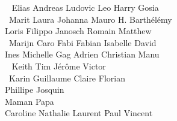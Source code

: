 \ \hspace{0.8cm} Elias \hspace{1.2cm} Andreas \hspace{0.9cm} Ludovic \hspace{2cm}Leo \hspace{0.6cm}Harry \hspace{1.1cm}Gosia\\

\ Marit \hspace{0.8cm}Laura \hspace{0.9cm}Johanna \hspace{4cm} Mauro H. \hspace{2.5cm} Barthélémy\\

\hspace{0.4cm} Loris \hspace{2.6cm}Filippo \hspace{3cm}Janosch \hspace{1.3cm}Romain \hspace{0.5cm}Matthew\\

\ Marijn \hspace{0.6cm}Caro \hspace{3cm}Fabi \hspace{0.4cm}Fabian \hspace{3.1cm}Isabelle \hspace{1cm}David \\

\hspace{2.2cm}Ines \hspace{1.1cm}Michelle \hspace{3cm}Gag \hspace{0.7cm}Adrien \hspace{1.8cm}Christian \hspace{0.9cm}Manu \\

\ \hspace{0.2cm} Keith \hspace{2.4cm}Tim \hspace{3cm}Jérôme \hspace{0.4cm}Victor\\

\ \hspace{1.2cm}Karin \hspace{4cm}Guillaume \hspace{0.7cm}Claire \hspace{2.2cm}Florian\\

\hspace{3.3cm}Phillipe \hspace{4.1cm}Josquin \\

\hspace{0.5cm}Maman  \hspace{2cm}Papa\\

\hspace{1cm}Caroline \hspace{2.5cm}Nathalie \hspace{2cm}Laurent \hspace{1.4cm}Paul \hspace{0.7cm}Vincent\\


\endgroup





  